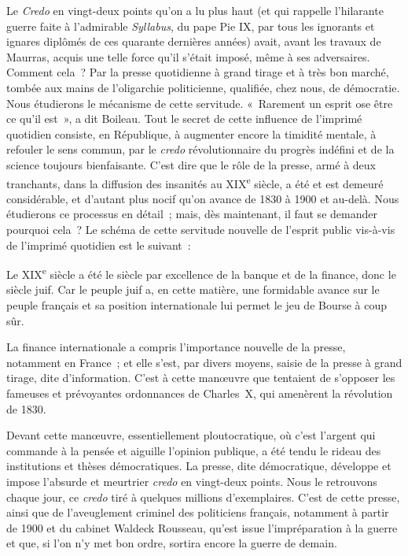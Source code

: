 \documentclass[french,twoside]{book} %
\begin{document}
Le {\itshape Credo} en vingt-deux points qu’on a lu plus haut (et qui rappelle l’hilarante guerre faite à l’admirable {\itshape Syllabus}, du pape Pie IX, par tous les ignorants et ignares diplômés de ces quarante dernières années) avait, avant les travaux de Maurras, acquis une telle force qu’il s’était imposé, même à ses adversaires. Comment cela ? Par la presse quotidienne à grand tirage et à très bon marché, tombée aux mains de l’oligarchie politicienne, qualifiée, chez nous, de démocratie. Nous étudierons le mécanisme de cette servitude. « Rarement un esprit ose être ce qu’il est », a dit Boileau. Tout le secret de cette influence de l’imprimé quotidien consiste, en République, à augmenter encore la timidité mentale, à refouler le sens commun, par le {\itshape credo} révolutionnaire du progrès indéfini et de la science toujours bienfaisante. C’est dire que le rôle de la presse, armé à deux tranchants, dans la diffusion des insanités au XIX\textsuperscript{e} siècle, a été et est demeuré considérable, et d’autant plus nocif qu’on avance de 1830 à 1900 et au-delà. Nous étudierons ce processus en détail ; mais, dès maintenant, il faut se demander pourquoi cela ? Le schéma de cette servitude nouvelle de l’esprit public vis-à-vis de l’imprimé quotidien est le suivant :\par
Le XIX\textsuperscript{e} siècle a été le siècle par excellence de la banque et de la finance, donc le siècle juif. Car le peuple juif a, en cette matière, une formidable avance sur le peuple français et sa position internationale lui permet le jeu de Bourse à coup sûr.\par
La finance internationale a compris l’importance nouvelle de la presse, notamment en France ; et elle s’est, par divers moyens, saisie de la presse à grand tirage, dite d’information. C’est à cette manœuvre que tentaient de s’opposer les fameuses et prévoyantes ordonnances de Charles X, qui amenèrent la révolution de 1830.\par
Devant cette manœuvre, essentiellement ploutocratique, où c’est l’argent qui commande à la pensée et aiguille l’opinion publique, a été tendu le rideau des institutions et thèses démocratiques. La presse, dite démocratique, développe et impose l’absurde et meurtrier {\itshape credo} en vingt-deux points. Nous le retrouvons chaque jour, ce {\itshape credo} tiré à quelques millions d’exemplaires. C’est de cette presse, ainsi que de l’aveuglement criminel des politiciens français, notamment à partir de 1900 et du cabinet Waldeck Rousseau, qu’est issue l’impréparation à la guerre et que, si l’on n’y met bon ordre, sortira encore la guerre de demain.\par
\end{document}
